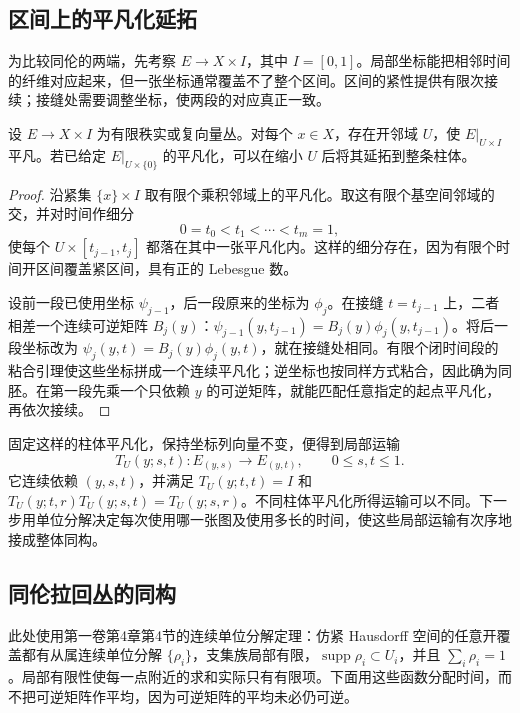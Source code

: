 \subsection{区间上的平凡化延拓}
\label{g2:subsec:1901:02}

为比较同伦的两端，先考察 \(E\to X\times I\)，其中 \(I=[0,1]\)。局部坐标能把相邻时间的纤维对应起来，但一张坐标通常覆盖不了整个区间。区间的紧性提供有限次接续；接缝处需要调整坐标，使两段的对应真正一致。

\begin{lemma}\label{g2:lem:bundle-cylinder-local-trivialization}
	设 \(E\to X\times I\) 为有限秩实或复向量丛。对每个 \(x\in X\)，存在开邻域 \(U\)，使 \(E|_{U\times I}\) 平凡。若已给定 \(E|_{U\times\{0\}}\) 的平凡化，可以在缩小 \(U\) 后将其延拓到整条柱体。
\end{lemma}
\begin{proof}
	沿紧集 \(\{x\}\times I\) 取有限个乘积邻域上的平凡化。取这有限个基空间邻域的交，并对时间作细分
	\[
		0=t_0<t_1<\cdots<t_m=1,
	\]
	使每个 \(U\times[t_{j-1},t_j]\) 都落在其中一张平凡化内。这样的细分存在，因为有限个时间开区间覆盖紧区间，具有正的 Lebesgue 数。

	设前一段已使用坐标 \(\psi_{j-1}\)，后一段原来的坐标为 \(\phi_j\)。在接缝 \(t=t_{j-1}\) 上，二者相差一个连续可逆矩阵 \(B_j(y)\)：\(\psi_{j-1}(y,t_{j-1})=B_j(y)\phi_j(y,t_{j-1})\)。将后一段坐标改为 \(\psi_j(y,t)=B_j(y)\phi_j(y,t)\)，就在接缝处相同。有限个闭时间段的粘合引理使这些坐标拼成一个连续平凡化；逆坐标也按同样方式粘合，因此确为同胚。在第一段先乘一个只依赖 \(y\) 的可逆矩阵，就能匹配任意指定的起点平凡化，再依次接续。
\end{proof}

固定这样的柱体平凡化，保持坐标列向量不变，便得到局部运输
\[
	T_U(y;s,t):E_{(y,s)}\longrightarrow E_{(y,t)},
	\qquad 0\le s,t\le1.
\]
它连续依赖 \((y,s,t)\)，并满足 \(T_U(y;t,t)=I\) 和 \(T_U(y;t,r)T_U(y;s,t)=T_U(y;s,r)\)。不同柱体平凡化所得运输可以不同。下一步用单位分解决定每次使用哪一张图及使用多长的时间，使这些局部运输有次序地接成整体同构。

\subsection{同伦拉回丛的同构}
\label{g2:subsec:1901:03}

此处使用第一卷第4章第4节的连续单位分解定理：仿紧 Hausdorff 空间的任意开覆盖都有从属连续单位分解 \(\{\rho_i\}\)，支集族局部有限，\(\operatorname{supp}\rho_i\subset U_i\)，并且 \(\sum_i\rho_i=1\)。局部有限性使每一点附近的求和实际只有有限项。下面用这些函数分配时间，而不把可逆矩阵作平均，因为可逆矩阵的平均未必仍可逆。

